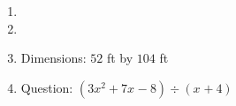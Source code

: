 \documentclass[12pt,twoside]{article}
\begin{document}
\begin{multicols}{2}
\begin{enumerate}
\def \a{7}\def \atwoone{1}\def \atwotwo{3}\def \atwothree{2}\def \btwothree{6}\def \sumtwothree{8}\def \diftwothree{-4}\def \bigtwothree{200}\def \powtwothree{36}\def \logtwothree{0.3868528072345416}\def \factortwothree{119}\def \atwofour{1.99}\def \btwofour{1.722}\def \tooshorttwofour{10.1}\def \moneytwofour{10.10}\def \longertwofour{10.10000}\def \atwofive{0.12}\def \btwofive{0.12346}\def \athreeone{6}\def \bthreeone{8}\def \setthreetwo{[12, 6, 9]}\def \athreetwo{12}\def \bthreetwo{6}\def \cthreetwo{9}\def \controlthreethree{5}\def \athreethree{3}\def \topthreethree{0}\def \athreefour{5}\def \bthreefour{2}\def \listthreefour{[1, 2, 3, 4]}\def \afourone{16}\def \bfourone{-2}\def \fracfourone{-8}\def \rootfourtwo{12}\def \simplifiedfourtwo{2 \sqrt{3}}\def \sqrtlistfourtwo{[2, 3]}\def \outfourtwo{2}\def \infourtwo{3}\def \wowfourtwo{1}\def \afourthree{5}\def \nicethreefour{3x^{2}-x^{}+5}\def \nastythreefour{xyz^{3}+5}\def \cfourthree{4}\def \dfourthree{9}\def \infourthree{4x^{}}\def \outfourthree{+9y^{}}\def \afourfour{1203896}\def \nicefourfour{1,203,896}\def \goodfourfour{1,000,000.12345}\def \badfourfour{1,000,000.1} \item  \def \a{7}\def \atwoone{2}\def \atwotwo{3}\def \atwothree{1}\def \btwothree{7}\def \sumtwothree{8}\def \diftwothree{-6}\def \bigtwothree{100}\def \powtwothree{7}\def \logtwothree{0.0}\def \factortwothree{38}\def \atwofour{1.57}\def \btwofour{1.496}\def \tooshorttwofour{10.1}\def \moneytwofour{10.10}\def \longertwofour{10.10000}\def \atwofive{0.12}\def \btwofive{0.12346}\def \athreeone{4}\def \bthreeone{3}\def \setthreetwo{[2, 5, 6]}\def \athreetwo{2}\def \bthreetwo{5}\def \cthreetwo{6}\def \controlthreethree{-8}\def \athreethree{1}\def \topthreethree{1}\def \athreefour{4}\def \bthreefour{3}\def \listthreefour{[1, 2, 3, 5]}\def \afourone{4}\def \bfourone{-2}\def \fracfourone{-2}\def \rootfourtwo{12}\def \simplifiedfourtwo{2 \sqrt{3}}\def \sqrtlistfourtwo{[2, 3]}\def \outfourtwo{2}\def \infourtwo{3}\def \wowfourtwo{1}\def \afourthree{-5}\def \nicethreefour{3x^{2}-x^{}-5}\def \nastythreefour{xyz^{3}-5}\def \cfourthree{4}\def \dfourthree{10}\def \infourthree{4x^{}}\def \outfourthree{+10y^{}}\def \afourfour{1482487}\def \nicefourfour{1,482,487}\def \goodfourfour{1,000,000.12345}\def \badfourfour{1,000,000.1} \item  \def \x{52}\def \y{104}\def \L{208}\def \area{5408} 
\item  Dimensions: $\x$ ft by $\y$ ft
\def \a{4}\def \b{3}\def \c{-5}\def \r{12}\def \monicpol{x^{}+4}\def \longnbad{3x^{2}+7x^{}-8}\def \anspol{3x^{}-5}
\item Question: $(\longnbad) \div (\monicpol)$   \\

\end{enumerate}
\end{multicols}
\end{document}
